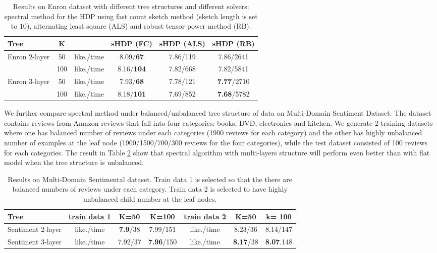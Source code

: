 \documentclass[twoside,11pt]{article}
\begin{document}
{\vspace{-3mm}

\begin{table}[tbh]\centering
\footnotesize
  \caption{Results on Enron
    dataset with different tree structures and different solvers: spectral method for the HDP using fast count sketch method (sketch length is set to $10$), alternating least square (ALS) and robust tensor power method (RB). 
    \label{tab:runtime} }
\begin{tabular}{@{}lccccc@{}}
Tree &K & &sHDP (FC) &sHDP (ALS) & sHDP (RB) \\ 
\hline
Enron 2-layer  &50		& like./time		&8.09/{\bf 67} 	&7.86/119&   7.86/2641  \\         
					&100		&like./time 		&8.16/{\bf 104} 	& 7.82/668&	7.82/5841 \\
Enron 3-layer &50		& like./time		&7.93/{\bf 68}		&  7.78/121&  {\bf 7.77}/2710 \\ 
		 		    &100		&like./time		&8.18/{\bf 101}	&7.69/852	&{\bf  7.68}/5782  \\
\end{tabular} 
\end{table}    
We further compare spectral method under balanced/unbalanced tree structure of data on Multi-Domain Sentiment Dataset. The dataset contains reviews from Amazon reviews that fall into four categories: books, DVD, electronics and kitchen. We generate $2$ training datasets where one has balanced number of reviews under each categories (1900 reviews for each category) and the other has highly unbalanced number of examples at the leaf node (1900/1500/700/300 reviews for the four categories), while the test dataset consisted of 100 reviews for each categories. The result in Table  \ref{tab:senti} show that spectral algorithm with multi-layers structure will perform even better than with flat model when the tree structure is unbalanced. 

\begin{table}[tbh]\centering
\footnotesize
  \caption{Results on Multi-Domain Sentimental dataset. Train data 1 is selected so that the there are balanced numbers of reviews under each category. Train data 2 is selected to have highly unbalanced child number at the leaf nodes.
    \label{tab:senti} }
\begin{tabular}{@{}lcccccc@{}}
Tree 						& train data 1	& K=50 	 	& K=100 	&train data 2 &K=50 	& k= 100 \\ 
\hline	
Sentiment 2-layer  	&  like./time		&{\bf 7.9}/38		& 7.99/151		&	like./time		&8.23/36	&  8.14/147\\         
Sentiment  3-layer  &like./time		&7.92/37		& {\bf 7.96}/150		&  like./time		&{\bf 8.17}/38&	{\bf 8.07}.148\\ 
\end{tabular} 
\end{table}  


}
\end{document}
